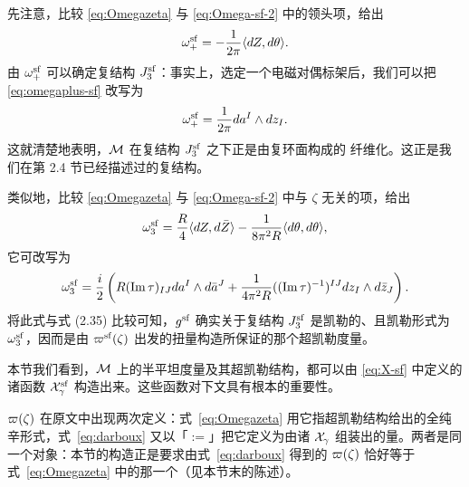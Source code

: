 先注意，比较 \eqref{eq:Omegazeta} 与 \eqref{eq:Omega-sf-2} 中的领头项，给出
\begin{equation} \label{eq:omegaplus-sf}
\omega_+^{\mathrm{sf}} = - \frac{1}{2\pi} \langle d Z, d \theta \rangle.
\end{equation}
由 $\omega_+^{\mathrm{sf}}$ 可以确定复结构 $J^{\mathrm{sf}}_3$：事实上，选定一个电磁对偶标架后，我们可以把 \eqref{eq:omegaplus-sf} 改写为
\begin{equation}
\omega_+^{\mathrm{sf}} = \frac{1}{2\pi} da^I \wedge dz_I.
\end{equation}
这就清楚地表明，$\mathcal{M}$ 在复结构 $J^{\mathrm{sf}}_3$ 之下正是由复环面构成的 \SW 纤维化。这正是我们在第 2.4 节已经描述过的复结构。%

类似地，比较 \eqref{eq:Omegazeta} 与 \eqref{eq:Omega-sf-2} 中与 $\zeta$ 无关的项，给出
\begin{equation} \label{eq:omega3-sf}
\omega_3^{\mathrm{sf}} = \frac{R}{4} \langle d Z , d \bar{Z} \rangle - \frac{1}{8 \pi^2 R} \langle d\theta, d \theta \rangle,
\end{equation}
它可改写为
\begin{equation}
\omega_3^{\mathrm{sf}} = \frac{i}{2} \left( R (\operatorname{Im} \tau)_{IJ} d a^I \wedge d \bar{a}^J + \frac{1}{4 \pi^2 R} ((\operatorname{Im} \tau)^{-1})^{IJ} dz_I \wedge d\bar{z}_J \right).
\end{equation}
将此式与式 (2.35) 比较可知，$g^{\mathrm{sf}}$ 确实关于复结构 $J^{\mathrm{sf}}_3$ 是凯勒的、且凯勒形式为 $\omega_3^{\mathrm{sf}}$，因而是由 $\varpi^{\mathrm{sf}}(\zeta)$ 出发的扭量构造所保证的那个超凯勒度量。%

本节我们看到，$\mathcal{M}$ 上的半平坦度量及其超凯勒结构，都可以由 \eqref{eq:X-sf} 中定义的诸函数 $\mathcal{X}_\gamma^{\mathrm{sf}}$ 构造出来。这些函数对下文具有根本的重要性。

\begin{yizhu}
$\varpi(\zeta)$ 在原文中出现两次定义：式~\eqref{eq:Omegazeta} 用它指超凯勒结构给出的全纯辛形式，式~\eqref{eq:darboux} 又以「$:=$」把它定义为由诸 $\mathcal{X}_\gamma$ 组装出的量。两者是同一个对象：本节的构造正是要求由式~\eqref{eq:darboux} 得到的 $\varpi(\zeta)$ 恰好等于式~\eqref{eq:Omegazeta} 中的那一个（见本节末的陈述）。
\end{yizhu}
